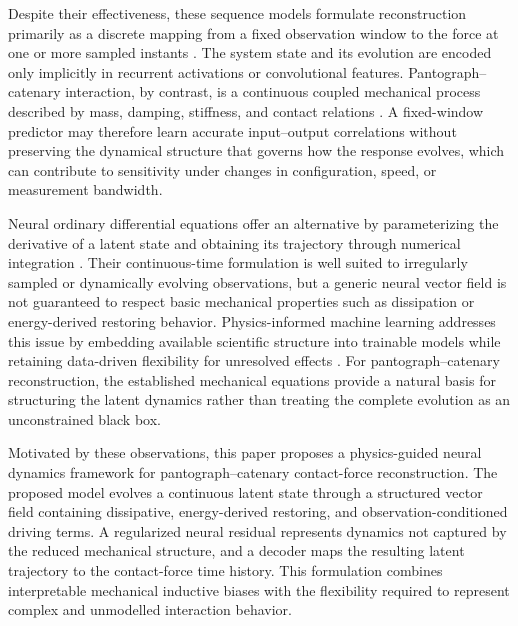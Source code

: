\documentclass[journal,twoside]{IEEEtran}
\begin{document}
Despite their effectiveness, these sequence models formulate reconstruction primarily as a discrete mapping from a fixed observation window to the force at one or more sampled instants \cite{ale2026realtime}. The system state and its evolution are encoded only implicitly in recurrent activations or convolutional features. Pantograph--catenary interaction, by contrast, is a continuous coupled mechanical process described by mass, damping, stiffness, and contact relations \cite{bruni2015benchmark,bruni2018interaction}. A fixed-window predictor may therefore learn accurate input--output correlations without preserving the dynamical structure that governs how the response evolves, which can contribute to sensitivity under changes in configuration, speed, or measurement bandwidth.

Neural ordinary differential equations offer an alternative by parameterizing the derivative of a latent state and obtaining its trajectory through numerical integration \cite{chen2018neuralode}. Their continuous-time formulation is well suited to irregularly sampled or dynamically evolving observations, but a generic neural vector field is not guaranteed to respect basic mechanical properties such as dissipation or energy-derived restoring behavior. Physics-informed machine learning addresses this issue by embedding available scientific structure into trainable models while retaining data-driven flexibility for unresolved effects \cite{karniadakis2021physics}. For pantograph--catenary reconstruction, the established mechanical equations provide a natural basis for structuring the latent dynamics rather than treating the complete evolution as an unconstrained black box.

Motivated by these observations, this paper proposes a physics-guided neural dynamics framework for pantograph--catenary contact-force reconstruction. The proposed model evolves a continuous latent state through a structured vector field containing dissipative, energy-derived restoring, and observation-conditioned driving terms. A regularized neural residual represents dynamics not captured by the reduced mechanical structure, and a decoder maps the resulting latent trajectory to the contact-force time history. This formulation combines interpretable mechanical inductive biases with the flexibility required to represent complex and unmodelled interaction behavior.
\end{document}
